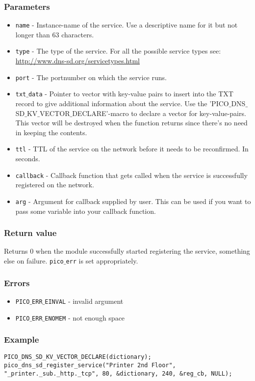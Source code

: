 \subsubsection*{Parameters}
\begin{itemize}[noitemsep]
\item \texttt{name} - Instance-name of the service. Use a descriptive name for it but not longer than 63 characters.
\item \texttt{type} - The type of the service. For all the possible service types see: \url{http://www.dns-sd.org/servicetypes.html}
\item \texttt{port} - The portnumber on which the service runs.
\item \texttt{txt$\_$data} - Pointer to vector with key-value pairs to insert into the TXT record to give additional information about the service. Use the 'PICO$\_$DNS$\_$SD$\_$KV$\_$VECTOR$\_$DECLARE'-macro to declare a vector for key-value-pairs. This vector will be destroyed when the function returns since there's no need in keeping the contents.
\item \texttt{ttl} - TTL of the service on the network before it needs to be reconfirmed. In seconds.
\item \texttt{callback} - Callback function that gets called when the service is successfully registered on the network.
\item \texttt{arg} -  Argument for callback supplied by user. This can be used if you want to pass some variable into your callback function.
\end{itemize}

\subsubsection*{Return value}
Returns 0 when the module successfully started registering the service, something else on failure. \texttt{pico$\_$err} is set appropriately.

\subsubsection*{Errors}
\begin{itemize}[noitemsep]
\item \texttt{PICO$\_$ERR$\_$EINVAL} - invalid argument
\item \texttt{PICO$\_$ERR$\_$ENOMEM} - not enough space
\end{itemize}

\subsubsection*{Example}
\begin{verbatim}
PICO_DNS_SD_KV_VECTOR_DECLARE(dictionary);
pico_dns_sd_register_service("Printer 2nd Floor", "_printer._sub._http._tcp", 80, &dictionary, 240, &reg_cb, NULL);
\end{verbatim}


